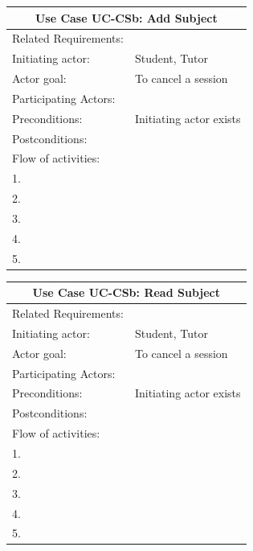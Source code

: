 \documentclass[12pt]{article}
\begin{document}
{    \begin{tabular}{| l | p{10cm}| }
      \hline\multicolumn{2}{|c|}{ \textbf{Use Case UC-CSb: Add Subject } }\\ \hline
      Related Requirements: &  \\ \hline
      Initiating actor: & Student, Tutor \\ \hline
      Actor goal: & To cancel a session\\ \hline
      Participating Actors: \\ \hline
      Preconditions: &Initiating actor exists\\ \hline
      Postconditions: & \\ \hline
      \multicolumn{2}{|l|}{Flow of activities:}\\ \hline
      \multicolumn{2}{|p{15cm}|}{1. }\\
      \multicolumn{2}{|p{15cm}|}{2. }\\
      \multicolumn{2}{|l|}{3. }\\
      \multicolumn{2}{|l|}{4. }\\
      \multicolumn{2}{|l|}{5. }\\
       \hline
    \end{tabular}

		\begin{tabular}{| l | p{10cm}| }
			\hline\multicolumn{2}{|c|}{ \textbf{Use Case UC-CSb: Read Subject } }\\ \hline
			Related Requirements: &  \\ \hline
			Initiating actor: & Student, Tutor \\ \hline
			Actor goal: & To cancel a session\\ \hline
			Participating Actors: \\ \hline
			Preconditions: &Initiating actor exists\\ \hline
			Postconditions: & \\ \hline
			\multicolumn{2}{|l|}{Flow of activities:}\\ \hline
			\multicolumn{2}{|p{15cm}|}{1. }\\
			\multicolumn{2}{|p{15cm}|}{2. }\\
			\multicolumn{2}{|l|}{3. }\\
			\multicolumn{2}{|l|}{4. }\\
			\multicolumn{2}{|l|}{5. }\\
			 \hline
		\end{tabular}

}
\end{document}
